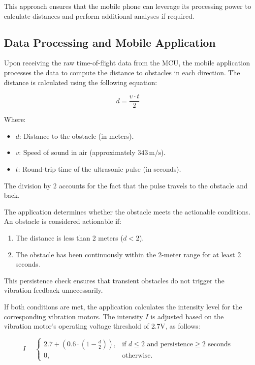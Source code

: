 This approach ensures that the mobile phone can leverage its processing power to calculate distances and perform additional analyses if required.

\subsection{Data Processing and Mobile Application}

Upon receiving the raw time-of-flight data from the MCU, the mobile application processes the data to compute the distance to obstacles in each direction. The distance is calculated using the following equation:

\[
d = \frac{v \cdot t}{2}
\]

Where:
\begin{itemize}
	\item \(d\): Distance to the obstacle (in meters).
	\item \(v\): Speed of sound in air (approximately \(343 \, \text{m/s}\)).
	\item \(t\): Round-trip time of the ultrasonic pulse (in seconds).
\end{itemize}

The division by 2 accounts for the fact that the pulse travels to the obstacle and back.

The application determines whether the obstacle meets the actionable conditions. An obstacle is considered actionable if:
\begin{enumerate}
	\item The distance is less than 2 meters (\(d < 2\)).
	\item The obstacle has been continuously within the 2-meter range for at least 2 seconds.
\end{enumerate}

This persistence check ensures that transient obstacles do not trigger the vibration feedback unnecessarily.

If both conditions are met, the application calculates the intensity level for the corresponding vibration motors. The intensity \(I\) is adjusted based on the vibration motor's operating voltage threshold of 2.7V, as follows:

\[
I = 
\begin{cases} 
	2.7 + (0.6 \cdot (1 - \frac{d}{2})), & \text{if } d \leq 2 \text{ and persistence} \geq 2 \text{ seconds} \\ 
	0, & \text{otherwise.}
\end{cases}
\]

